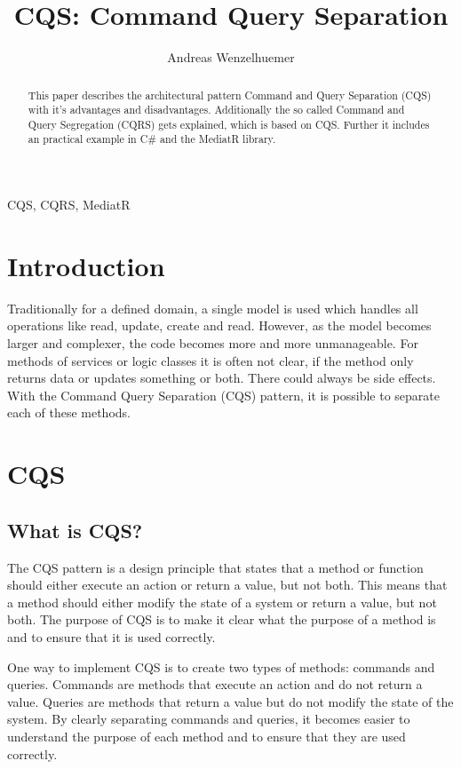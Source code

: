 \documentclass[11pt,conference]{IEEEtran}
\author{Andreas Wenzelhuemer}
\begin{document}
\title{CQS: Command Query Separation}

\maketitle

\begin{abstract}
This paper describes the architectural pattern Command and Query Separation (CQS) with it's advantages and disadvantages.
Additionally the so called Command and Query Segregation (CQRS) gets explained, which is based on CQS.
Further it includes an practical example in C\# and the MediatR library. 
\end{abstract}

\begin{IEEEkeywords}
CQS, CQRS, MediatR
\end{IEEEkeywords}

\section{Introduction}

Traditionally for a defined domain, a single model is used which handles all operations like read, update, create and read.
However, as the model becomes larger and complexer, the code becomes more and more unmanageable.
For methods of services or logic classes it is often not clear, if the method only returns data or updates something or both.
There could always be side effects.
With the Command Query Separation (CQS) pattern, it is possible to separate each of these methods.

\section{CQS}

\subsection{What is CQS?}

The CQS pattern is a design principle that states that a method or function should either execute an action or return a value, but not both. This means that a method should either modify the state of a system or return a value, but not both. The purpose of CQS is to make it clear what the purpose of a method is and to ensure that it is used correctly.

One way to implement CQS is to create two types of methods: commands and queries. Commands are methods that execute an action and do not return a value. Queries are methods that return a value but do not modify the state of the system. By clearly separating commands and queries, it becomes easier to understand the purpose of each method and to ensure that they are used correctly.
\end{document}

